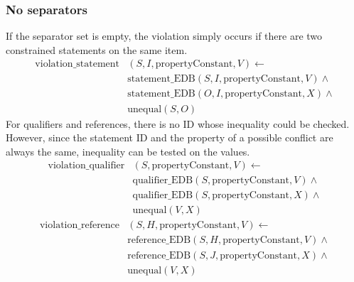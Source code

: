 \documentclass[hyperref,bachelorofscience,fleqn]{cgvpub}
\begin{document}
\subsubsection{No separators}\label{subsubsec_single_value_no_separators}
If the separator set is empty, the violation simply occurs if there are two constrained statements on the same item. 
\begin{equation}\label{eq_no_separators_triple}
\begin{split}
\text{violation\_statement}&(S, I, \text{propertyConstant}, V) \leftarrow \\
&\text{statement\_EDB}(S, I, \text{propertyConstant}, V) \wedge{} \\
&\text{statement\_EDB}(O, I, \text{propertyConstant}, X) \wedge{} \\
&\text{unequal}(S, O)
\end{split}
\end{equation}
For qualifiers and references, there is no ID whose inequality could be checked. However, since the statement ID and the property of a possible conflict are always the same, inequality can be tested on the values.
\begin{equation*}
\begin{split}
\text{violation\_qualifier}&(S, \text{propertyConstant}, V) \leftarrow \\
&\text{qualifier\_EDB}(S, \text{propertyConstant}, V) \wedge{} \\
&\text{qualifier\_EDB}(S, \text{propertyConstant}, X) \wedge{} \\
&\text{unequal}(V, X)
\end{split}
\end{equation*}
\begin{equation*}
\begin{split}
\text{violation\_reference}&(S, H, \text{propertyConstant}, V) \leftarrow \\
&\text{reference\_EDB}(S, H, \text{propertyConstant}, V) \wedge{} \\
&\text{reference\_EDB}(S, J, \text{propertyConstant}, X) \wedge{} \\
&\text{unequal}(V, X)
\end{split}
\end{equation*}
\end{document}
